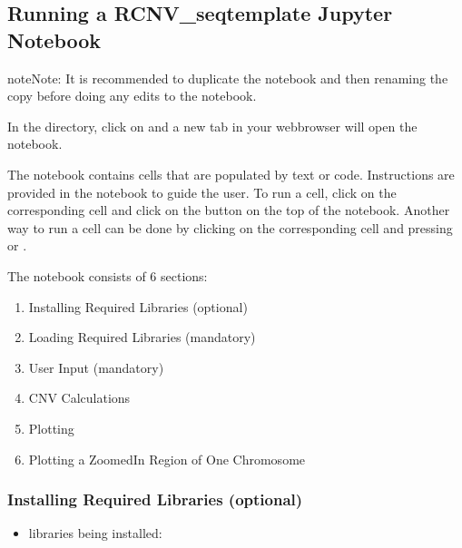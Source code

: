 \documentclass[letterpaper,10pt,english]{sphinxhowto}
\begin{document}
\subsection{Running a RCNV\_seq\sphinxhyphen{}template Jupyter Notebook}
\label{\detokenize{index:running-a-rcnv-seq-template-jupyter-notebook}}
\begin{sphinxadmonition}{note}{Note:}
\sphinxAtStartPar
It is recommended to duplicate the  notebook and then renaming the copy before doing any edits to the notebook.
\end{sphinxadmonition}

\sphinxAtStartPar
In the  directory, click on  and a new tab in your web\sphinxhyphen{}browser will open the notebook.

\sphinxAtStartPar
The notebook contains cells that are populated by text or code. Instructions are provided in the notebook to guide the user. To run a cell, click on the corresponding cell and click on the  button on the top of the notebook. Another way to run a cell can be done by clicking on the corresponding cell and pressing  or .

\sphinxAtStartPar
The notebook consists of 6 sections:
\begin{enumerate}
%
\item {} 
\sphinxAtStartPar
Installing Required Libraries (optional)

\item {} 
\sphinxAtStartPar
Loading Required Libraries (mandatory)

\item {} 
\sphinxAtStartPar
User Input (mandatory)

\item {} 
\sphinxAtStartPar
CNV Calculations

\item {} 
\sphinxAtStartPar
Plotting

\item {} 
\sphinxAtStartPar
Plotting a Zoomed\sphinxhyphen{}In Region of One Chromosome

\end{enumerate}


\subsubsection{Installing Required Libraries (optional)}
\label{\detokenize{index:installing-required-libraries-optional}}\begin{itemize}
\item {} 
\sphinxAtStartPar
libraries being installed:

\end{itemize}
\end{document}
